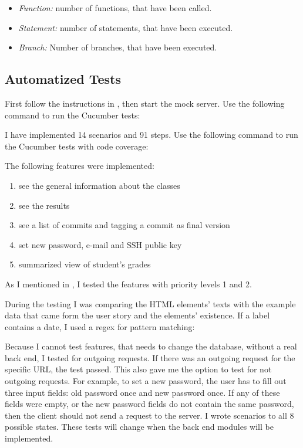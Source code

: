 \begin{itemize}
	\item \emph{Function:} number of functions, that have been called.
	\item \emph{Statement:} number of statements, that have been executed.
	\item \emph{Branch:} Number of branches, that have been executed.
\end{itemize}

\subsection{Automatized Tests}
First follow the instructions in , then start the mock server. Use the following command to run the Cucumber tests:


I have implemented 14 scenarios and 91 steps. Use the following command to run the Cucumber tests with code coverage:


The following features were implemented:

\begin{enumerate}
	\item see the general information about the classes
	\setcounter{enumi}{0}
	\item see the results
	\item see a list of commits and tagging a commit as final version
	\setcounter{enumi}{1}
	\item set new password, e-mail and SSH public key
	\item summarized view of student's grades
\end{enumerate}

As I mentioned in , I tested the features with priority levels 1 and 2.

During the testing I was comparing the HTML elements' texts with the example data that came form the user story and the elements' existence. If a label contains a date, I used a regex for pattern matching:


Because I cannot test features, that needs to change the database, without a real back end, I tested for outgoing requests. If there was an outgoing request for the specific URL, the test passed. This  also gave me the option to test for not outgoing requests. For example, to set a new password, the user has to fill out three input fields: old password once and new password once. If any of these fields were empty, or the new password fields do not contain the same password, then the client should not send a request to the server. I wrote scenarios to all 8 possible states. These tests will change when the back end modules will be implemented.

